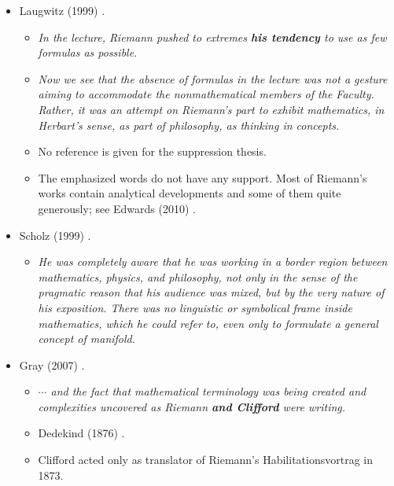 \documentclass[12pt]{article}
\begin{document}
\begin{itemize}
\item[$\bullet$]Laugwitz (1999) \cite{Laugwitz1999}.

\begin{itemize}

\item[]{\it In the lecture, Riemann pushed to extremes {\bf his tendency} to use as few formulas as possible.}

\item[]{\it Now we see that the absence of formulas in the lecture was not a gesture aiming to accommodate the nonmathematical members of the Faculty. Rather, it was an attempt on Riemann's part to exhibit mathematics, in Herbart's sense, as part of philosophy, as thinking in concepts.}

\item[$\bullet$]No reference is given for the suppression thesis.

\item[]The emphasized words do not have any support. Most of Riemann's works contain analytical developments and some of them quite generously; see Edwards (2010) \cite{Edwards2010}.

\end{itemize}

\item[$\bullet$]Scholz (1999) \cite{Scholz1999}.

\begin{itemize}

\item[]{\it He was completely aware that he was working in a border region between mathematics, physics, and philosophy, not only in the sense of the pragmatic reason that his audience was mixed, but by the very nature of his exposition. There was no linguistic or symbolical frame inside mathematics, which he could refer to, even only to formulate a general concept of manifold}.

\end{itemize}

\item[$\bullet$]Gray (2007) \cite{Gray2007}.

\begin{itemize}

\item[]{\it $\cdots$ and the fact that mathematical terminology was being created and complexities uncovered as Riemann {\bf and Clifford} were writing.}

\item[$\bullet$]Dedekind (1876) \cite{Dedekind1876b}.

\item[]Clifford acted only as translator of Riemann's Habilitationsvortrag in 1873.

\end{itemize}

\end{itemize}
\end{document}
